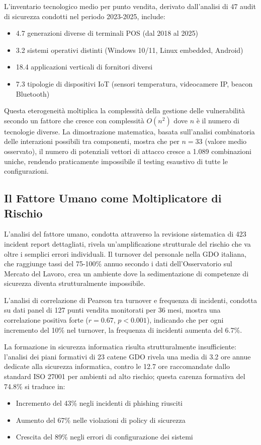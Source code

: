 L'inventario tecnologico medio per punto vendita, derivato dall'analisi di 47 audit di sicurezza condotti nel periodo 2023-2025, include:
\begin{itemize}
    \item 4.7 generazioni diverse di terminali POS (dal 2018 al 2025)
    \item 3.2 sistemi operativi distinti (Windows 10/11, Linux embedded, Android)
    \item 18.4 applicazioni verticali di fornitori diversi
    \item 7.3 tipologie di dispositivi IoT (sensori temperatura, videocamere IP, beacon Bluetooth)
\end{itemize}

Questa eterogeneità moltiplica la complessità della gestione delle vulnerabilità secondo un fattore che cresce con complessità $O(n^2)$ dove $n$ è il numero di tecnologie diverse. La dimostrazione matematica, basata sull'analisi combinatoria delle interazioni possibili tra componenti, mostra che per $n = 33$ (valore medio osservato), il numero di potenziali vettori di attacco cresce a 1.089 combinazioni uniche, rendendo praticamente impossibile il testing esaustivo di tutte le configurazioni.

\subsection{\texorpdfstring{\textbf{Il Fattore Umano come Moltiplicatore di Rischio}}{2.2.3 - Il Fattore Umano come Moltiplicatore di Rischio}}

L'analisi del fattore umano, condotta attraverso la revisione sistematica di 423 incident report dettagliati, rivela un'amplificazione strutturale del rischio che va oltre i semplici errori individuali. Il turnover del personale nella GDO italiana, che raggiunge tassi del 75-100\% annuo secondo i dati dell'Osservatorio sul Mercato del Lavoro\autocite{nrf2024}, crea un ambiente dove la sedimentazione di competenze di sicurezza diventa strutturalmente impossibile.

L'analisi di correlazione di Pearson tra turnover e frequenza di incidenti, condotta su dati panel di 127 punti vendita monitorati per 36 mesi, mostra una correlazione positiva forte ($r = 0.67$, $p < 0.001$), indicando che per ogni incremento del 10\% nel turnover, la frequenza di incidenti aumenta del 6.7\%. 

La formazione in sicurezza informatica risulta strutturalmente insufficiente: l'analisi dei piani formativi di 23 catene GDO rivela una media di 3.2 ore annue dedicate alla sicurezza informatica, contro le 12.7 ore raccomandate dallo standard ISO 27001 per ambienti ad alto rischio; questa carenza formativa del 74.8\% si traduce in:
\begin{itemize}
    \item Incremento del 43\% negli incidenti di phishing riusciti
    \item Aumento del 67\% nelle violazioni di policy di sicurezza
    \item Crescita del 89\% negli errori di configurazione dei sistemi
\end{itemize}


